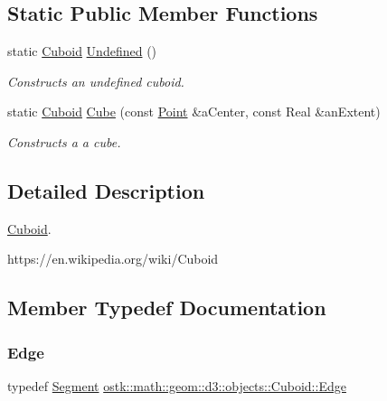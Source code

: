 \subsection*{Static Public Member Functions}
\begin{DoxyCompactItemize}
\item 
static \hyperlink{classostk_1_1math_1_1geom_1_1d3_1_1objects_1_1_cuboid}{Cuboid} \hyperlink{classostk_1_1math_1_1geom_1_1d3_1_1objects_1_1_cuboid_aab6e643de544bd3de7529cc71a934f7a}{Undefined} ()
\begin{DoxyCompactList}\small\item\em Constructs an undefined cuboid. \end{DoxyCompactList}\item 
static \hyperlink{classostk_1_1math_1_1geom_1_1d3_1_1objects_1_1_cuboid}{Cuboid} \hyperlink{classostk_1_1math_1_1geom_1_1d3_1_1objects_1_1_cuboid_a6a42b2d344c9a6e12feef60ceea77b9d}{Cube} (const \hyperlink{classostk_1_1math_1_1geom_1_1d3_1_1objects_1_1_point}{Point} \&a\+Center, const Real \&an\+Extent)
\begin{DoxyCompactList}\small\item\em Constructs a a cube. \end{DoxyCompactList}\end{DoxyCompactItemize}


\subsection{Detailed Description}
\hyperlink{classostk_1_1math_1_1geom_1_1d3_1_1objects_1_1_cuboid}{Cuboid}. 

https\+://en.wikipedia.\+org/wiki/\+Cuboid 

\subsection{Member Typedef Documentation}
\mbox{\label{classostk_1_1math_1_1geom_1_1d3_1_1objects_1_1_cuboid_af9482cb1219e7d447aaf76b6e2dbb1d1}} 
\subsubsection{\texorpdfstring{Edge}{Edge}}
{\footnotesize\ttfamily typedef \hyperlink{classostk_1_1math_1_1geom_1_1d3_1_1objects_1_1_segment}{Segment} \hyperlink{classostk_1_1math_1_1geom_1_1d3_1_1objects_1_1_cuboid_af9482cb1219e7d447aaf76b6e2dbb1d1}{ostk\+::math\+::geom\+::d3\+::objects\+::\+Cuboid\+::\+Edge}}

